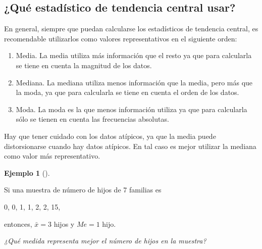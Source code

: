 \documentclass[
  spanish,
  a4paper,
]{scrreport}
\theoremstyle{plain}
\theoremstyle{definition}
\newtheorem{example}{Ejemplo}[chapter]
\theoremstyle{definition}
\theoremstyle{remark}
\begin{document}
\subsection{¿Qué estadístico de tendencia central
usar?}\label{quuxe9-estaduxedstico-de-tendencia-central-usar}

En general, siempre que puedan calcularse los estadísticos de tendencia
central, es recomendable utilizarlos como valores representativos en el
siguiente orden:

\begin{enumerate}
\def\labelenumi{\arabic{enumi}.}
\item
  Media. La media utiliza más información que el resto ya que para
  calcularla se tiene en cuenta la magnitud de los datos.
\item
  Mediana. La mediana utiliza menos información que la media, pero más
  que la moda, ya que para calcularla se tiene en cuenta el orden de los
  datos.
\item
  Moda. La moda es la que menos información utiliza ya que para
  calcularla sólo se tienen en cuenta las frecuencias absolutas.
\end{enumerate}

\begin{tcolorbox}[enhanced jigsaw, arc=.35mm, bottomrule=.15mm, bottomtitle=1mm, breakable, colback=white, colbacktitle=quarto-callout-warning-color!10!white, colframe=quarto-callout-warning-color-frame, coltitle=black, left=2mm, leftrule=.75mm, opacityback=0, opacitybacktitle=0.6, rightrule=.15mm, title=\textcolor{quarto-callout-warning-color}{\faExclamationTriangle}\hspace{0.5em}{Advertencia}, titlerule=0mm, toprule=.15mm, toptitle=1mm]

Hay que tener cuidado con los datos atípicos, ya que la media puede
distorsionarse cuando hay datos atípicos. En tal caso es mejor utilizar
la mediana como valor más representativo.

\end{tcolorbox}

\begin{example}[]\protect\hypertarget{exm-media-mediana-datos-atipicos}{}\label{exm-media-mediana-datos-atipicos}

Si una muestra de número de hijos de 7 familias es

0, 0, 1, 1, 2, 2, 15,

entonces, \(\bar{x}=3\) hijos y \(Me=1\) hijo.

\emph{¿Qué medida representa mejor el número de hijos en la muestra?}

\end{example}
\end{document}
